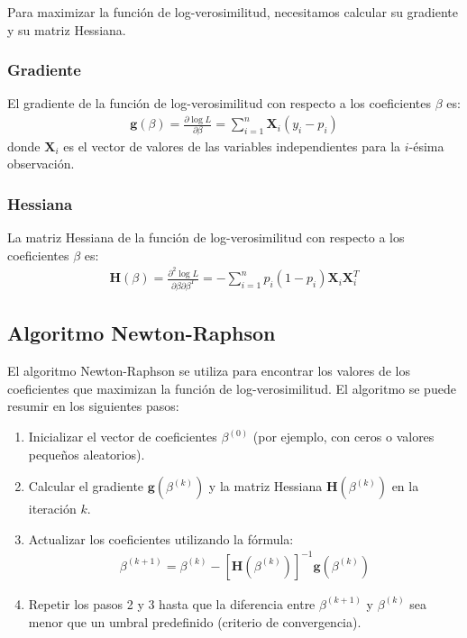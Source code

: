 \documentclass[a4paper]{report} %
\begin{document}
Para maximizar la funci\'on de log-verosimilitud, necesitamos calcular su gradiente y su matriz Hessiana.

\subsubsection{Gradiente}

El gradiente de la funci\'on de log-verosimilitud con respecto a los coeficientes $\beta$ es:
\begin{eqnarray*}
\mathbf{g}(\beta) = \frac{\partial \log L}{\partial \beta} = \sum_{i=1}^{n} \mathbf{X}_i (y_i - p_i)
\end{eqnarray*}
donde $\mathbf{X}_i$ es el vector de valores de las variables independientes para la $i$-\'esima observaci\'on.

\subsubsection{Hessiana}

La matriz Hessiana de la funci\'on de log-verosimilitud con respecto a los coeficientes $\beta$ es:
\begin{eqnarray*}
\mathbf{H}(\beta) = \frac{\partial^2 \log L}{\partial \beta \partial \beta^T} = -\sum_{i=1}^{n} p_i (1 - p_i) \mathbf{X}_i \mathbf{X}_i^T
\end{eqnarray*}

\subsection{Algoritmo Newton-Raphson}

El algoritmo Newton-Raphson se utiliza para encontrar los valores de los coeficientes que maximizan la funci\'on de log-verosimilitud. El algoritmo se puede resumir en los siguientes pasos:
\begin{enumerate}
    \item Inicializar el vector de coeficientes $\beta^{(0)}$ (por ejemplo, con ceros o valores peque\~nos aleatorios).
    \item Calcular el gradiente $\mathbf{g}(\beta^{(k)})$ y la matriz Hessiana $\mathbf{H}(\beta^{(k)})$ en la iteraci\'on $k$.
    \item Actualizar los coeficientes utilizando la f\'ormula:
    \begin{eqnarray*}
    \beta^{(k+1)} = \beta^{(k)} - \left[ \mathbf{H}(\beta^{(k)}) \right]^{-1} \mathbf{g}(\beta^{(k)})
    \end{eqnarray*}
    \item Repetir los pasos 2 y 3 hasta que la diferencia entre $\beta^{(k+1)}$ y $\beta^{(k)}$ sea menor que un umbral predefinido (criterio de convergencia).
\end{enumerate}
\end{document}
